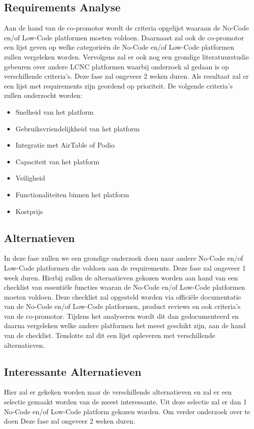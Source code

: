 \subsection*{Requirements Analyse}
\label{sub:requirements-analyse}
Aan de hand van de co-promotor wordt de criteria opgelijst waaraan de No-Code en/of Low-Code platformen moeten voldoen.
Daarnaast zal ook de co-promotor een lijst geven op welke categorieën de No-Code en/of Low-Code platformen zullen vergeleken worden. 
Vervolgens zal er ook nog een grondige literatuurstudie gebeuren over andere LCNC platformen waarbij onderzoek al gedaan is op verschillende
criteria's. Deze fase zal ongeveer 2 weken duren. Als resultaat zal er een lijst met requirements zijn geordend op prioriteit.
De volgende criteria's zullen onderzocht worden:
\begin{itemize}
  \item Snelheid van het platform
  \item Gebruiksvriendelijkheid van het platform
  \item Integratie met AirTable of Podio
  \item Capaciteit van het platform
  \item Veiligheid
  \item Functionaliteiten binnen het platform
  \item Kostprijs
\end{itemize}

\subsection*{Alternatieven}
\label{sub:alternatieven}
In deze fase zullen we een grondige onderzoek doen naar andere No-Code en/of Low-Code platformen die voldoen aan de requirements. Deze fase zal ongeveer 1 week duren. 
Hierbij zullen de alternatieven gekozen worden aan hand van een checklist van essentiële functies waaran de No-Code en/of Low-Code platformen moeten voldoen.
Deze checklist zal opgesteld worden via officiële documentatie van de No-Code en/of Low-Code platformen, product reviews en ook criteria's van de co-promotor.
Tijdens het analyseren wordt dit dan gedocumenteerd en daarna vergeleken welke andere platformen het meest geschikt zijn, aan de hand van de checklist.
Tenslotte zal dit een lijst opleveren met verschillende alternatieven.

\subsection*{Interessante Alternatieven}
\label{sub:interessante-alternatieven}
Hier zal er gekeken worden naar de verschillende alternatieven en zal er een selectie gemaakt worden van de meest interessante.
Uit deze selectie zal er dan 1 No-Code en/of Low-Code platform gekozen worden. Om verder onderzoek over te doen
Deze fase zal ongeveer 2 weken duren.

